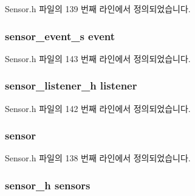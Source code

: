 Sensor.\-h 파일의 139 번째 라인에서 정의되었습니다.

\hypertarget{struct___sensor_extend_a40552729aa41c7e02154f5f031c48224}{
\subsubsection[{event}]{\setlength{\rightskip}{0pt plus 5cm}sensor\-\_\-event\-\_\-s event}}\label{struct___sensor_extend_a40552729aa41c7e02154f5f031c48224}


Sensor.\-h 파일의 143 번째 라인에서 정의되었습니다.

\hypertarget{struct___sensor_extend_aa977dfb866b24fd7d9a20a9a01b2fd1f}{
\subsubsection[{listener}]{\setlength{\rightskip}{0pt plus 5cm}sensor\-\_\-listener\-\_\-h listener}}\label{struct___sensor_extend_aa977dfb866b24fd7d9a20a9a01b2fd1f}


Sensor.\-h 파일의 142 번째 라인에서 정의되었습니다.

\hypertarget{struct___sensor_extend_a788321ec5c87f740898fb2e99ea6da01}{
\subsubsection[{sensor}]{ sensor}}\label{struct___sensor_extend_a788321ec5c87f740898fb2e99ea6da01}


Sensor.\-h 파일의 138 번째 라인에서 정의되었습니다.

\hypertarget{struct___sensor_extend_a5b4eecc7d526422f0b49ff84cac94eb0}{
\subsubsection[{sensors}]{\setlength{\rightskip}{0pt plus 5cm}sensor\-\_\-h sensors}}\label{struct___sensor_extend_a5b4eecc7d526422f0b49ff84cac94eb0}


